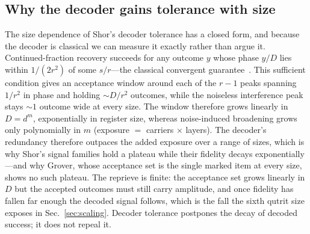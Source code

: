 \documentclass[aps,pra,reprint,superscriptaddress,nofootinbib,floatfix]{revtex4-2}
\begin{document}
\subsection{Why the decoder gains tolerance with size}
\label{sec:decoder}

The size dependence of Shor's decoder tolerance has a closed form, and
because the decoder is classical we can measure it exactly rather than
argue it. Continued-fraction recovery succeeds for any outcome $y$
whose phase $y/D$ lies within $1/(2r^2)$ of some $s/r$---the classical
convergent guarantee~\cite{hardy2008,shor1997}. This sufficient
condition gives an acceptance window around each of the $r-1$ peaks
spanning $1/r^2$ in phase and holding ${\sim}D/r^2$ outcomes, while the
noiseless interference peak stays ${\sim}1$ outcome wide at every
size. The window therefore grows
linearly in $D=d^m$, exponentially in register size, whereas
noise-induced broadening grows only polynomially in $m$ (exposure $=$
carriers $\times$ layers). The decoder's redundancy therefore outpaces
the added exposure over a range of sizes, which is why Shor's signal
families hold a plateau while their fidelity decays exponentially---and
why Grover, whose acceptance set is the single marked item at every
size, shows no such plateau. The reprieve is finite: the acceptance set
grows linearly in $D$ but the accepted outcomes must still carry
amplitude, and once fidelity has fallen far enough the decoded signal
follows, which is the fall the sixth qutrit size exposes in
Sec.~\ref{sec:scaling}. Decoder tolerance postpones the decay of
decoded success; it does not repeal it.
\end{document}
